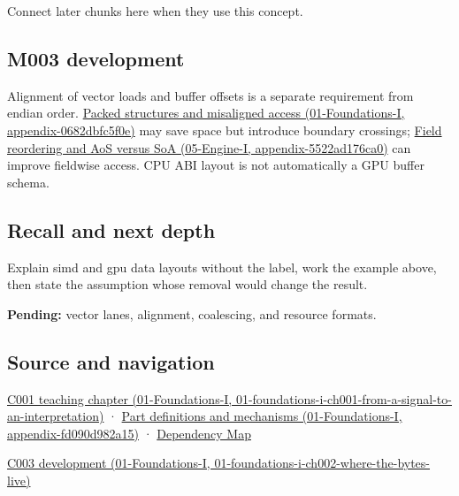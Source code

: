 Connect later chunks here when they use this concept.

\subsection{M003 development}\label{appendix-3c7b1a56de01-m003-development}

Alignment of vector loads and buffer offsets is a separate requirement from endian order. \href{../01-Foundations-I/main.pdf\#nameddest=appendix-0682dbfc5f0e}{Packed structures and misaligned access (01-Foundations-I, appendix-0682dbfc5f0e)} may save space but introduce boundary crossings; \href{../05-Engine-I/main.pdf\#nameddest=appendix-5522ad176ca0}{Field reordering and AoS versus SoA (05-Engine-I, appendix-5522ad176ca0)} can improve fieldwise access. CPU ABI layout is not automatically a GPU buffer schema.

\subsection{Recall and next depth}\label{appendix-3c7b1a56de01-recall-and-next-depth}

Explain simd and gpu data layouts without the label, work the example above, then state the assumption whose removal would change the result.

\textbf{Pending:} vector lanes, alignment, coalescing, and resource formats.

\subsection{Source and navigation}\label{appendix-3c7b1a56de01-source-and-navigation}

\href{../01-Foundations-I/main.pdf\#nameddest=01-foundations-i-ch001-from-a-signal-to-an-interpretation}{C001 teaching chapter (01-Foundations-I, 01-foundations-i-ch001-from-a-signal-to-an-interpretation)} · \href{../01-Foundations-I/main.pdf\#nameddest=appendix-fd090d982a15}{Part definitions and mechanisms (01-Foundations-I, appendix-fd090d982a15)} · \hyperref[appendix-4ad47bdd269a]{Dependency Map}

\href{../01-Foundations-I/main.pdf\#nameddest=01-foundations-i-ch002-where-the-bytes-live}{C003 development (01-Foundations-I, 01-foundations-i-ch002-where-the-bytes-live)}
